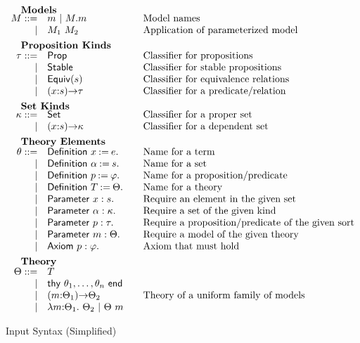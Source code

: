 \begin{figure}
\[\begin{array}{rl@{\qquad}l}
		\noalign{\textbf{Models}}		
		\im ::= 
		    & \iM  \ibar \iselect{\im}{\iM}&\mbox{Model names}\\
		  | & \iapp{\im_1}{\im_2}&\mbox{Application of parameterized model}\\[5pt]
		
		\noalign{\textbf{Proposition Kinds}}
		\ipt ::=
		    & \iProp & \mbox{Classifier for propositions}\\
		  | & \iStable & \mbox{Classifier for stable propositions}\\
		  | & \iEquiv{\is} &\mbox{Classifier for equivalence relations}\\
		  | & \idarrow{\ix}{\is}{\ipt} & \mbox{Classifier for a predicate/relation}\\[5pt] 
		
		\noalign{\textbf{Set Kinds}}
		\ik ::= 
		    & \iSet &\mbox{Classifier for a proper set}\\
		   | & \idarrow{\ix}{\is}{\ik} &\mbox{Classifier for a dependent set}\\[5pt]
		

		\noalign{\textbf{Theory Elements}}
		\ite ::=
		     & \iDefinition{\ix}{\ie}.&\mbox{Name for a term}\\
		   | & \iDefinition{\iS}{\is}.&\mbox{Name for a set}\\
		   | & \iDefinition{\iP}{\ip}.&\mbox{Name for a proposition/predicate}\\
		   | & \iDefinition{\iTH}{\ith}.&\mbox{Name for a theory}\\
		   | & \iParameter{\ix}{\is}.&\mbox{Require an element in the given set}\\
		   | & \iParameter{\iS}{\ik}.&\mbox{Require a set of the given kind}\\
		   | & \iParameter{\iP}{\ipt}.&\mbox{Require a proposition/predicate of the given sort}\\
		   | & \iParameter{\iM}{\ith}.&\mbox{Require a model of the given theory}\\
		   | & \iAxiom{\iP}{\ip}.&\mbox{Axiom that must hold}\\[5pt]

  		\noalign{\textbf{Theory}}
		\ith ::= 
		     & \iTH\\
		   	| & \ithy{\ite_1,\ldots,\ite_n}\\
		 	| & \idarrow{\iM}{\ith_1}{\ith_2} &\mbox{Theory of a uniform family of models}\\
		  	| & \ilambda{\iM}{\ith_1}{\ith_2} \ibar 
		      \iapp{\ith}{\iM}\\
	\end{array}
	\]
	\label{fig:input}
	\caption{Input Syntax (Simplified)}
\end{figure}

